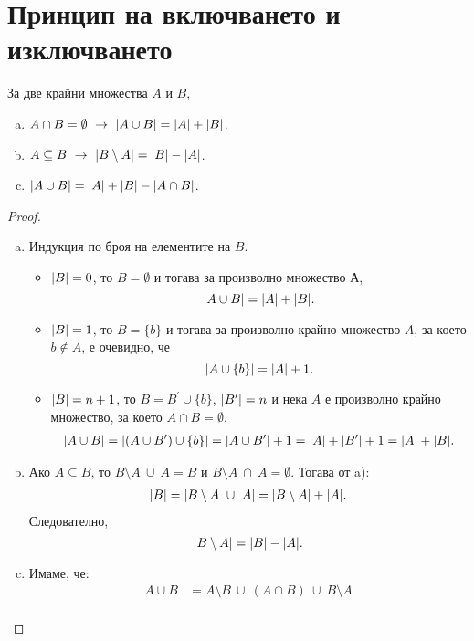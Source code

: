 \section{Принцип на включването и изключването}

\begin{prop}
  За две крайни множества $A$ и $B$,
  \begin{enumerate}[a)]
  \item 
    $A \cap B = \emptyset\ \rightarrow\ \abs{A\cup B} = \abs{A} + \abs{B}$.
  \item
    $A\subseteq B\ \rightarrow\ \abs{B\setminus A} = \abs{B} - \abs{A}$.
  \item
    $\lvert{A\cup B}\rvert = \lvert{A}\rvert + \lvert{B}\rvert - \lvert{A\cap B}\rvert$.
  \end{enumerate}
\end{prop}
\begin{proof}
  \begin{enumerate}[a)]
  \item
    Индукция по броя на елементите на $B$.
    \begin{itemize}
    \item
      $\lvert{B}\rvert = 0$, то $B = \emptyset$ и тогава за произволно множество $А$,
      \[\lvert{A\cup B}\rvert = \lvert{A}\rvert + \lvert{B}\rvert.\]
    \item
      $\lvert{B}\rvert = 1$, то $B = \{b\}$ и тогава за произволно крайно множество $A$, за което $b \not\in A$,
      е очевидно, че \[\lvert{A\cup\{b\}}\rvert = \lvert{A}\rvert + 1.\]
    \item
      $\lvert{B}\rvert = n+1$, то $B = B^\prime \cup \{b\}$, $\lvert{B^\prime}\rvert = n$ и 
      нека $A$ е произволно крайно множество, за което $A \cap B = \emptyset$.
      \begin{align*}
        \lvert{A \cup B}\rvert = \lvert{(A \cup B^\prime) \cup \{b\}}\rvert = \lvert{A\cup B^\prime}\rvert + 1 = \lvert{A}\rvert + \lvert{B^\prime}\rvert + 1 = \lvert{A}\rvert + \lvert{B}\rvert.
      \end{align*}
    \end{itemize}
  \item
    Ако $A \subseteq B$, то $B\setminus A\ \cup\ A = B$ и $B\setminus A\ \cap\ A = \emptyset$. Тогава от a):
    \begin{align*}
      \lvert{B}\rvert = \lvert{B\setminus A\ \cup\ A}\rvert = \lvert{B\setminus A}\rvert + \lvert{A}\rvert.
    \end{align*}
    Следователно,
    \[\lvert{B\setminus A}\rvert = \lvert{B}\rvert - \lvert{A}\rvert.\]
  \item
    Имаме, че:
    \begin{align*}
      A\cup B & = A \setminus B\ \cup\ (A\cap B)\ \cup\ B\setminus A\\

\end{align*}
\end{enumerate}
\end{proof}

